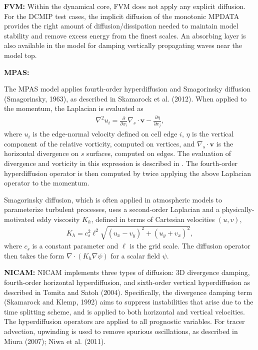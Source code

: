 \documentclass{article}
\newcommand{\vb}{\mathbf}
\newcommand{\pdiff}[2]{\frac{\partial #1}{\partial #2}}
\begin{document}
\textbf{FVM:}  {\color{blue}Within the dynamical core, FVM does not apply any explicit diffusion.  For the DCMIP test cases, the implicit diffusion of the monotonic MPDATA provides the right amount of diffusion/dissipation needed to maintain model stability and remove excess energy from the finest scales.  An absorbing layer is also available in the model for damping vertically propagating waves near the model top.}

\textbf{MPAS:}  {\color{blue}The MPAS model applies fourth-order hyperdiffusion and Smagorinsky diffusion (Smagorinsky, 1963), as described in Skamarock et al. (2012).  When applied to the momentum, the Laplacian is evaluated as
\begin{align}
\nabla^2 u_i = \pdiff{}{x_i} \nabla_s \cdot \vb{v} - \pdiff{\eta}{x_j},
\end{align} where $u_i$ is the edge-normal velocity defined on cell edge $i$, $\eta$ is the vertical component of the relative vorticity, computed on vertices, and $\nabla_s \cdot \vb{v}$ is the horizontal divergence on $s$ surfaces, computed on edges.  The evaluation of divergence and vorticity in this expression is described in \cite{ringler2010unified}.  The fourth-order hyperdiffusion operator is then computed by twice applying the above Laplacian operator to the momentum.

Smagorinsky diffusion, which is often applied in atmospheric models to parameterize turbulent processes, uses a second-order Laplacian and a physically-motivated eddy viscosity $K_h$, defined in terms of Cartesian velocities $(u,v)$,
\begin{align}
K_h = c_s^2 \ell^2 \sqrt{(u_x - v_y)^2 + (u_y + v_x)^2},
\end{align} where $c_s$ is a constant parameter and $\ell$ is the grid scale.  The diffusion operator then takes the form $\nabla \cdot (K_h \nabla \psi)$ for a scalar field $\psi$.}

\textbf{NICAM:}  {\color{blue}NICAM implements three types of diffusion: 3D divergence damping, fourth-order horizontal hyperdiffusion, and sixth-order vertical hyperdiffusion as described in Tomita and Satoh (2004). Specifically, the divergence damping term (Skamarock and Klemp, 1992) aims to suppress instabilities that arise due to the time splitting scheme, and is applied to both horizontal and vertical velocities. The hyperdiffusion operators are applied to all prognostic variables. For tracer advection, upwinding is used to remove spurious oscillations, as described in Miura (2007); Niwa et al. (2011).}
\end{document}
